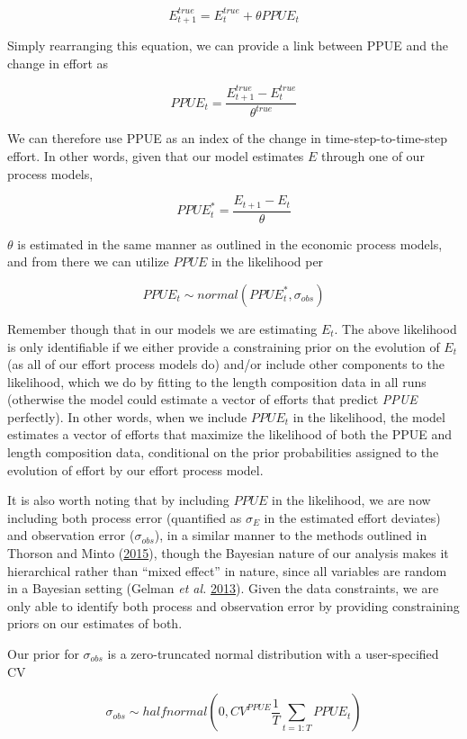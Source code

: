 \documentclass[twoside,12pt,final]{ucthesis-CA2012}
\begin{document}
\begin{ucmainmatter}
\[E_{t + 1}^{true} = E_{t}^{true} + \theta{PPUE_{t}}\]

Simply rearranging this equation, we can provide a link between PPUE and
the change in effort as

\[PPUE_{t} = \frac{E_{t + 1}^{true} - E_{t}^{true}}{\theta^{true}}\]

We can therefore use PPUE as an index of the change in
time-step-to-time-step effort. In other words, given that our model
estimates \(E\) through one of our process models,

\[PPUE_{t}^* = \frac{E_{t+1} - E_{t}}{\theta}\]

\(\theta\) is estimated in the same manner as outlined in the economic
process models, and from there we can utilize \(PPUE\) in the likelihood
per

\[PPUE_{t} \sim normal(PPUE_{t}^*,\sigma_{obs})\]

Remember though that in our models we are estimating \(E_{t}\). The
above likelihood is only identifiable if we either provide a
constraining prior on the evolution of \(E_{t}\) (as all of our effort
process models do) and/or include other components to the likelihood,
which we do by fitting to the length composition data in all runs
(otherwise the model could estimate a vector of efforts that predict
\emph{PPUE} perfectly). In other words, when we include \(PPUE_{t}\) in
the likelihood, the model estimates a vector of efforts that maximize
the likelihood of both the PPUE and length composition data, conditional
on the prior probabilities assigned to the evolution of effort by our
effort process model.

It is also worth noting that by including \(PPUE\) in the likelihood, we
are now including both process error (quantified as \(\sigma_E\) in the
estimated effort deviates) and observation error (\(\sigma_{obs}\)), in
a similar manner to the methods outlined in Thorson and Minto
(\protect\hyperlink{ref-Thorson2015b}{2015}), though the Bayesian nature
of our analysis makes it hierarchical rather than ``mixed effect'' in
nature, since all variables are random in a Bayesian setting (Gelman
\emph{et al.} \protect\hyperlink{ref-Gelman2013}{2013}). Given the data
constraints, we are only able to identify both process and observation
error by providing constraining priors on our estimates of both.

Our prior for \(\sigma_{obs}\) is a zero-truncated normal distribution
with a user-specified CV

\[ \sigma_{obs} \sim halfnormal(0, CV^{PPUE}\frac{1}{T}\sum_{t = 1:T}{PPUE_{t}})\]


\end{ucmainmatter}
\end{document}

